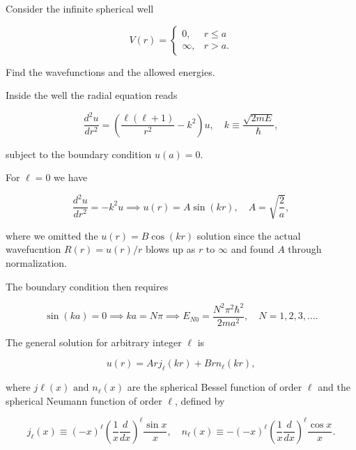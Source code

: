 \documentclass[a4paper,12pt]{report}
\begin{document}
{Consider the infinite spherical well

\begin{equation}
  V(r) = \begin{cases}
    0,& r \le a\\
    \infty,& r > a.
  \end{cases}
\end{equation}

Find the wavefunctions and the allowed energies.
}
{Inside the well the radial equation reads 

\begin{equation}
  \frac{d^2u}{dr^2} = \left( \frac{\ell (\ell +1)}{r^2} - k^2 \right)u, \quad k \equiv \frac{\sqrt{2mE} }{\hbar }, 
\end{equation}

subject to the boundary condition \(u(a)=0\).

For \(\ell =0\) we have 

\begin{equation}
  \frac{d^2u}{dr^2} = -k^2u \implies u(r) = A\sin (kr), \quad A = \sqrt{\frac{2}{a} }, 
\end{equation}

where we omitted the \(u(r) = B\cos (kr)\) solution since the actual wavefucntion \(R(r)=u(r) /r\)  blows up as \(r\text { to } \infty\) and found \(A\) through normalization.

The boundary condition then requires 

\begin{equation}
  \sin (ka) = 0 \implies ka = N\pi \implies E_{N0} = \frac{N^2\pi ^2\hbar ^2}{2ma^2}, \quad N = 1,2,3,\ldots .  
\end{equation}

The general solution for arbitrary integer \(\ell \) is 

\begin{equation}
  u(r) = Ar j_{\ell }(kr) + Br n_{\ell }(kr),  
\end{equation}

where \(j\ell (x) \text { and } n_{\ell }(x) \) are the spherical Bessel function of order \(\ell \) and the spherical Neumann function of order \(\ell \), defined by 

\begin{equation}
  j_{\ell }(x) \equiv (-x)^{\ell } \left( \frac{1}{x} \frac{d}{dx}   \right)^{\ell } \frac{\sin x}{x}, \quad n_{\ell }(x) \equiv - (-x)^{\ell } \left( \frac{1}{x} \frac{d}{dx}   \right)^{\ell } \frac{\cos x}{x}.  
\end{equation}

}
\end{document}

